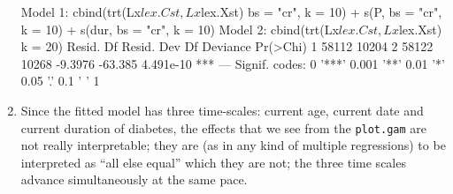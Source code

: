 \begin{enumerate}[resume]
\begin{Schunk}
\begin{Soutput}
Model 1: cbind(trt(Lx$lex.Cst, Lx$lex.Xst) %in% trnam, Lx$lex.dur) ~ s(A, 
    bs = "cr", k = 10) + s(P, bs = "cr", k = 10) + s(dur, bs = "cr", 
    k = 10)
Model 2: cbind(trt(Lx$lex.Cst, Lx$lex.Xst) %in% trnam, Lx$lex.dur) ~ s(A, 
    k = 20)
  Resid. Df Resid. Dev      Df Deviance  Pr(>Chi)    
1     58112      10204                               
2     58122      10268 -9.3976  -63.385 4.491e-10 ***
---
Signif. codes:  0 '***' 0.001 '**' 0.01 '*' 0.05 '.' 0.1 ' ' 1
\end{Soutput}
\end{Schunk}




\item Since the fitted model has three time-scales: current age,
  current date and current duration of diabetes, the effects that
  we see from the \texttt{plot.gam} are not really interpretable; they
  are (as in any kind of multiple regressions) to be interpreted as
  ``all else equal'' which they are not; the three time scales
  advance simultaneously at the same pace.


\end{enumerate}
